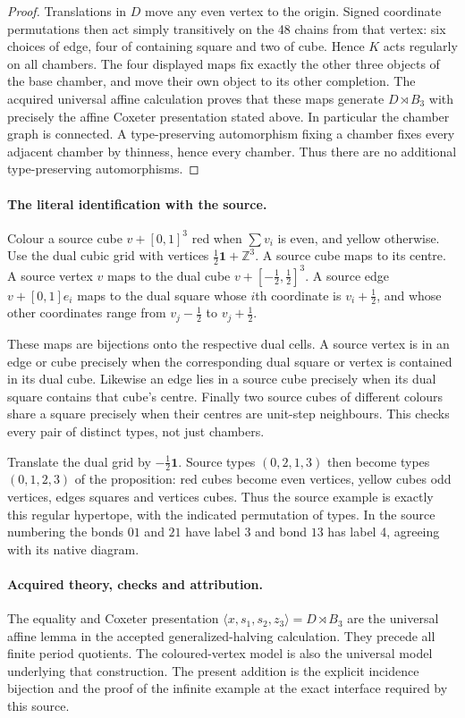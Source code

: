 \documentclass[11pt]{article}
\begin{document}
\begin{proof}
Translations in $D$ move any even vertex to the origin. Signed coordinate
permutations then act simply transitively on the 48 chains from that
vertex: six choices of edge, four of containing square and two of cube.
Hence $K$ acts regularly on all chambers. The four displayed maps fix
exactly the other three objects of the base chamber, and move their own
object to its other completion. The acquired universal affine calculation
proves that these maps generate $D\rtimes B_3$ with precisely the affine
Coxeter presentation stated above. In particular the chamber graph is
connected. A type-preserving automorphism fixing a chamber fixes every
adjacent chamber by thinness, hence every chamber. Thus there are no
additional type-preserving automorphisms.
\end{proof}

\newpage
\paragraph{The literal identification with the source.}
Colour a source cube $v+[0,1]^3$ red when $\sum v_i$ is even, and yellow
otherwise. Use the dual cubic grid with vertices
$\frac12\mathbf1+\mathbb Z^3$. A source cube maps to its centre.
A source vertex $v$ maps to the dual cube
$v+[-\frac12,\frac12]^3$. A source edge
$v+[0,1]e_i$ maps to the dual square whose $i$th coordinate is
$v_i+\frac12$, and whose other coordinates range from
$v_j-\frac12$ to $v_j+\frac12$.

These maps are bijections onto the respective dual cells. A source
vertex is in an edge or cube precisely when the corresponding dual
square or vertex is contained in its dual cube. Likewise an edge lies
in a source cube precisely when its dual square contains that cube's
centre. Finally two source cubes of different colours share a square
precisely when their centres are unit-step neighbours. This checks
every pair of distinct types, not just chambers.

Translate the dual grid by $-\frac12\mathbf1$. Source types
$(0,2,1,3)$ then become types $(0,1,2,3)$ of the proposition:
red cubes become even vertices, yellow cubes odd vertices, edges
squares and vertices cubes. Thus the source example is exactly this
regular hypertope, with the indicated permutation of types. In the
source numbering the bonds $01$ and $21$ have label 3 and bond $13$
has label 4, agreeing with its native diagram.

\paragraph{Acquired theory, checks and attribution.}
The equality and Coxeter presentation
$\langle x,s_1,s_2,z_3\rangle=D\rtimes B_3$ are the universal affine
lemma in the accepted generalized-halving calculation. They precede
all finite period quotients. The coloured-vertex model is also the
universal model underlying that construction. The present addition is
the explicit incidence bijection and the proof of the infinite example
at the exact interface required by this source.
\end{document}
